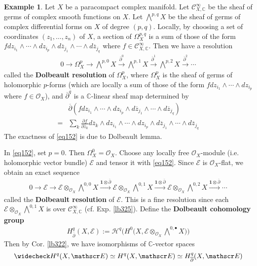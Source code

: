\documentclass[12pt,b5paper,notitlepage]{report}
\theoremstyle{definition}
\newtheorem{eg}[df]{Example}
\theoremstyle{plain}
\newcommand{\mc}{\mathcal}
\newcommand{\wch}{\widecheck}
\newcommand{\ovl}{\overline}
\newcommand{\id}{\mathbf{1}}
\newcommand{\scr}{\mathscr}
\newcommand{\blt}{\bullet}
\newcommand{\Cbb}{\mathbb C}
\numberwithin{equation}{section}
\begin{document}
\begin{eg}
Let $X$ be a paracompact complex manifold. Let $\scr C^\infty_{X,\Cbb}$ be the sheaf of germs of complex smooth functions on $X$. Let $\bigwedge^{p,q}X$ be the sheaf of germs of complex differential forms on $X$ of degree $(p,q)$. Locally, by choosing a set of coordinates $(z_1,\dots,z_n)$ of $X$, a section of $\Omega_X^{p,q}$ is a sum of those of the form $fdz_{i_1}\wedge\cdots \wedge dz_{i_p}\wedge d\ovl z_{j_1}\wedge \cdots\wedge d\ovl z_{j_q}$ where $f\in\scr C^\infty_{X,\Cbb}$. Then we have a resolution
\begin{align}
0\rightarrow \Omega_X^p\rightarrow \bigwedge\nolimits^{p,0}X\xrightarrow{\ovl\partial^0}\bigwedge\nolimits^{p,1}X\xrightarrow{\ovl\partial^1}\bigwedge\nolimits^{p,2}X\xrightarrow{\ovl\partial^2}\cdots \label{eq152}
\end{align}
called the \textbf{Dolbeault resolution}  of $\Omega_X^p$, where $\Omega_X^p$ is the sheaf of germs of holomorphic $p$-forms (which are locally a sum of those of the form $fdz_{i_1}\wedge\cdots\wedge dz_{i_p}$ where $f\in\scr O_X$), and $\ovl\partial^q$ is a $\Cbb$-linear sheaf map determined by
\begin{align*}
&\ovl\partial(fdz_{i_1}\wedge\cdots \wedge dz_{i_p}\wedge d\ovl z_{j_1}\wedge \cdots\wedge d\ovl z_{j_q})\\
=&\sum_k \frac{\partial f}{\partial\ovl z_k} d\ovl z_k \wedge dz_{i_1}\wedge\cdots \wedge dz_{i_p}\wedge d\ovl z_{j_1}\wedge \cdots\wedge d\ovl z_{j_q}
\end{align*}
The exactness of \eqref{eq152} is due to Dolbeault lemma.

In \eqref{eq152}, set $p=0$. Then $\Omega_X^0=\scr O_X$. Choose any locally free $\scr O_X$-module (i.e. holomorphic vector bundle) $\scr E$ and tensor it with \eqref{eq152}. Since $\scr E$ is $\scr O_X$-flat, we obtain an exact sequence
\begin{align}
0\rightarrow \scr E\rightarrow \scr E\otimes_{\scr O_X}\bigwedge\nolimits^{0,0}X\xrightarrow{\id\otimes\ovl\partial}\scr E\otimes_{\scr O_X}\bigwedge\nolimits^{0,1}X\xrightarrow{\id\otimes\ovl\partial}\scr E\otimes_{\scr O_X}\bigwedge\nolimits^{0,2}X\xrightarrow{\id\otimes\ovl\partial}\cdots \label{eq153}
\end{align}
called the \textbf{Dolbeault resolution}  of $\scr E$. This is a fine resolution since each $\scr E\otimes_{\scr O_X}\bigwedge^{0,1}X$ is over $\scr C^\infty_{X,\Cbb}$ (cf. Exp. \ref{lb325}). Define the \textbf{Dolbeault cohomology group} \index{00@Dolbeauly cohomology $H^q_{\ovl\partial}(X,\scr E)$}
\begin{align*}
H^q_{\ovl\partial}(X,\scr E):=\mc H^q\Big(H^0\big(X,\scr E\otimes_{\scr O_X}\bigwedge\nolimits^{0,\blt}X\big) \Big)
\end{align*}
Then by Cor. \ref{lb322}, we have isomorphisms of $\Cbb$-vector spaces
\begin{align}
\wch H^q(X,\scr E)\simeq H^q(X,\scr E)\simeq H^q_{\ovl\partial}(X,\scr E)
\end{align}
\end{eg}
\end{document}
